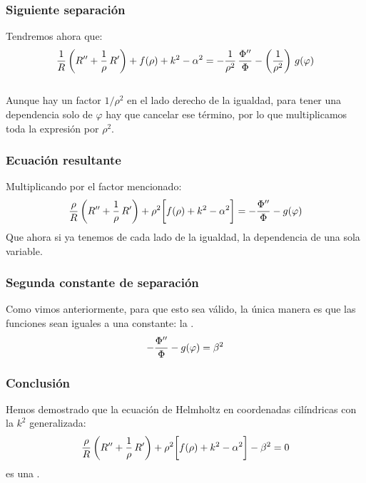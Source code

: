 \documentclass[12pt]{beamer}
\begin{document}
\begin{frame}
\frametitle{Siguiente separación}
Tendremos ahora que:
\pause
\begin{align*}
\dfrac{1}{R} \left( {R}^{\prime \prime} + \dfrac{1}{\rho} \, {R}^{\prime} \right) + f(\rho) + k^{2} - \alpha^{2} = - \dfrac{1}{\rho^{2}} \, \dfrac{{\Phi}^{\prime \prime}}{\Phi} - \left( \dfrac{1}{\rho^{2}} \right) \, g(\varphi)
\end{align*}
\\
\bigskip
\pause
Aunque hay un factor $1/\rho^{2}$ en el lado derecho de la igualdad, para tener una dependencia solo de $\varphi$ hay que cancelar ese término, \pause por lo que multiplicamos toda la expresión por $\rho^{2}$.
\end{frame}
\begin{frame}
\frametitle{Ecuación resultante}
Multiplicando por el factor mencionado:
\pause
\begin{align*}
\dfrac{\rho}{R} \left( {R}^{\prime \prime} + \dfrac{1}{\rho} \, {R}^{\prime} \right) + \rho^{2} \bigg[ f(\rho) + k^{2} - \alpha^{2} \bigg] = - \dfrac{{\Phi}^{\prime \prime}}{\Phi} - g(\varphi)
\end{align*}
\pause
Que ahora si ya tenemos de cada lado de la igualdad, la dependencia de una sola variable.
\end{frame}
\begin{frame}
\frametitle{Segunda constante de separación}
Como vimos anteriormente, para que esto sea válido, la única manera es que las funciones sean iguales a una constante: \pause la .
\pause
\begin{align*}
- \dfrac{{\Phi}^{\prime \prime}}{\Phi} - g(\varphi) = \beta^{2}
\end{align*}
\end{frame}
\begin{frame}
\frametitle{Conclusión}
Hemos demostrado que la ecuación de Helmholtz en coordenadas cilíndricas con la $k^{2}$ generalizada:
\pause
\begin{align*}
\dfrac{\rho}{R} \left( {R}^{\prime \prime} + \dfrac{1}{\rho} \, {R}^{\prime} \right) + \rho^{2} \bigg[ f(\rho) + k^{2} - \alpha^{2} \bigg] - \beta^{2} = 0
\end{align*}
\pause
es una .
\end{frame}

\end{document}
